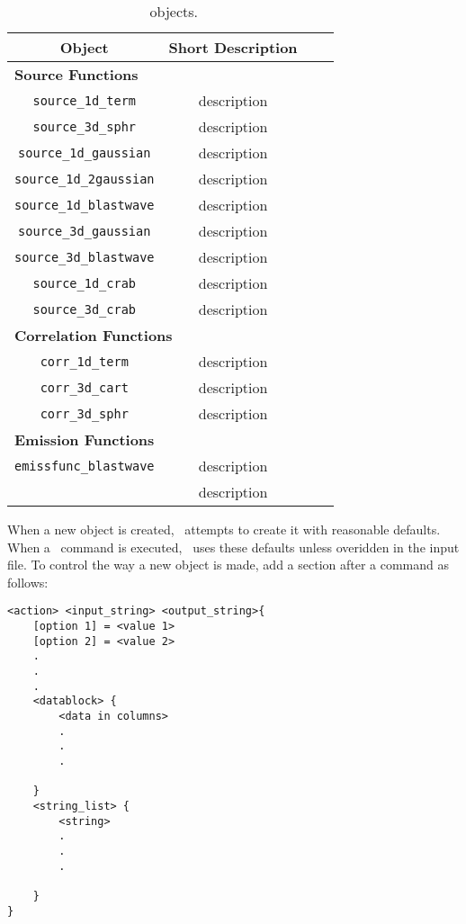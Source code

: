 \begin{table*}
\begin{tabular}{|c|c|c|c|}
    \hline\hline
    Object  & Short Description\\ \hline\hline
    \multicolumn{2}{|l|}{\bf Source Functions}\\ \hline
    {\tt source\_1d\_term}  &description\\ \hline
    {\tt source\_3d\_sphr} &  description\\ \hline
    {\tt source\_1d\_gaussian} &  description\\ \hline
    {\tt source\_1d\_2gaussian} &  description\\ \hline
    {\tt source\_1d\_blastwave} &  description\\ \hline
    {\tt source\_3d\_gaussian} &  description\\ \hline
    {\tt source\_3d\_blastwave} &  description\\ \hline
    {\tt source\_1d\_crab} &  description\\ \hline
    {\tt source\_3d\_crab} &  description\\ \hline
    \multicolumn{2}{|l|}{\bf Correlation Functions}\\ \hline
    {\tt corr\_1d\_term} &  description\\ \hline
    {\tt corr\_3d\_cart} &   description\\ \hline
    {\tt corr\_3d\_sphr} &   description\\ \hline
    \multicolumn{2}{|l|}{\bf Emission Functions}\\ \hline
    {\tt emissfunc\_blastwave}& description\\ \hline
    {\tt } &  description\\ \hline\hline
\end{tabular}
\caption{\reefer\, objects.}
\label{objects}
\end{table*}

When a new object is created, \coral\, attempts to create it with reasonable
defaults.  When a \reefer\, command is executed, \reefer\, uses these defaults
unless overidden in the input file.  To control the way a new object is made, 
add a section after a command as follows:
\begin{verbatim}
<action> <input_string> <output_string>{
    [option 1] = <value 1>
    [option 2] = <value 2>
    .
    .
    .
    <datablock> {
        <data in columns>
        .
        .
        .
        
    }
    <string_list> {
        <string>
        .
        .
        .
        
    }
}
\end{verbatim}

